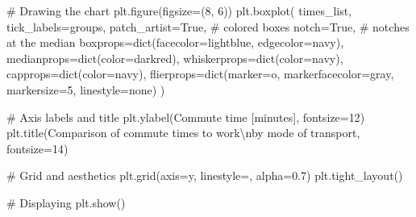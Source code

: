 \documentclass[
  english,
  letterpaper,
  DIV=11,
  numbers=noendperiod]{scrreprt}
\newenvironment{Shaded}{\begin{snugshade}}{\end{snugshade}}
\newcommand{\BuiltInTok}[1]{\textcolor[rgb]{0.00,0.23,0.31}{#1}}
\newcommand{\CharTok}[1]{\textcolor[rgb]{0.13,0.47,0.30}{#1}}
\newcommand{\CommentTok}[1]{\textcolor[rgb]{0.37,0.37,0.37}{#1}}
\newcommand{\DecValTok}[1]{\textcolor[rgb]{0.68,0.00,0.00}{#1}}
\newcommand{\FloatTok}[1]{\textcolor[rgb]{0.68,0.00,0.00}{#1}}
\newcommand{\NormalTok}[1]{\textcolor[rgb]{0.00,0.23,0.31}{#1}}
\newcommand{\OperatorTok}[1]{\textcolor[rgb]{0.37,0.37,0.37}{#1}}
\newcommand{\StringTok}[1]{\textcolor[rgb]{0.13,0.47,0.30}{#1}}
\newcommand{\VariableTok}[1]{\textcolor[rgb]{0.07,0.07,0.07}{#1}}
\newcounter{none} %
\begin{document}
\begin{Shaded}
\begin{Highlighting}[]
\CommentTok{\# Drawing the chart}
\NormalTok{plt.figure(figsize}\OperatorTok{=}\NormalTok{(}\DecValTok{8}\NormalTok{, }\DecValTok{6}\NormalTok{))}
\NormalTok{plt.boxplot(}
\NormalTok{    times\_list,}
\NormalTok{    tick\_labels}\OperatorTok{=}\NormalTok{groups,}
\NormalTok{    patch\_artist}\OperatorTok{=}\VariableTok{True}\NormalTok{,    }\CommentTok{\# colored boxes}
\NormalTok{    notch}\OperatorTok{=}\VariableTok{True}\NormalTok{,           }\CommentTok{\# notches at the median}
\NormalTok{    boxprops}\OperatorTok{=}\BuiltInTok{dict}\NormalTok{(facecolor}\OperatorTok{=}\StringTok{\textquotesingle{}lightblue\textquotesingle{}}\NormalTok{, edgecolor}\OperatorTok{=}\StringTok{\textquotesingle{}navy\textquotesingle{}}\NormalTok{),}
\NormalTok{    medianprops}\OperatorTok{=}\BuiltInTok{dict}\NormalTok{(color}\OperatorTok{=}\StringTok{\textquotesingle{}darkred\textquotesingle{}}\NormalTok{),}
\NormalTok{    whiskerprops}\OperatorTok{=}\BuiltInTok{dict}\NormalTok{(color}\OperatorTok{=}\StringTok{\textquotesingle{}navy\textquotesingle{}}\NormalTok{),}
\NormalTok{    capprops}\OperatorTok{=}\BuiltInTok{dict}\NormalTok{(color}\OperatorTok{=}\StringTok{\textquotesingle{}navy\textquotesingle{}}\NormalTok{),}
\NormalTok{    flierprops}\OperatorTok{=}\BuiltInTok{dict}\NormalTok{(marker}\OperatorTok{=}\StringTok{\textquotesingle{}o\textquotesingle{}}\NormalTok{, markerfacecolor}\OperatorTok{=}\StringTok{\textquotesingle{}gray\textquotesingle{}}\NormalTok{, markersize}\OperatorTok{=}\DecValTok{5}\NormalTok{, linestyle}\OperatorTok{=}\StringTok{\textquotesingle{}none\textquotesingle{}}\NormalTok{)}
\NormalTok{)}

\CommentTok{\# Axis labels and title}
\NormalTok{plt.ylabel(}\StringTok{\textquotesingle{}Commute time [minutes]\textquotesingle{}}\NormalTok{, fontsize}\OperatorTok{=}\DecValTok{12}\NormalTok{)}
\NormalTok{plt.title(}\StringTok{\textquotesingle{}Comparison of commute times to work}\CharTok{\textbackslash{}n}\StringTok{by mode of transport\textquotesingle{}}\NormalTok{, fontsize}\OperatorTok{=}\DecValTok{14}\NormalTok{)}

\CommentTok{\# Grid and aesthetics}
\NormalTok{plt.grid(axis}\OperatorTok{=}\StringTok{\textquotesingle{}y\textquotesingle{}}\NormalTok{, linestyle}\OperatorTok{=}\StringTok{\textquotesingle{}{-}{-}\textquotesingle{}}\NormalTok{, alpha}\OperatorTok{=}\FloatTok{0.7}\NormalTok{)}
\NormalTok{plt.tight\_layout()}

\CommentTok{\# Displaying}
\NormalTok{plt.show()}
\end{Highlighting}
\end{Shaded}
\end{document}
